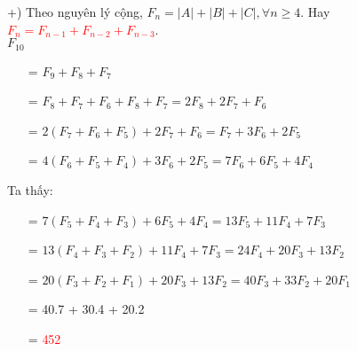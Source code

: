\documentclass[12pt,oneside]{book}
\begin{document}
+) Theo nguyên lý cộng, $F_n = |A|+|B|+|C|, \forall n \geq 4$. Hay \textcolor{red}{$F_n= F_{n-1}+F_{n-2}+F_{n-3}$}.\\
\indent \hspace{0.5cm}$F_{10}$
\begin{itemize}
	\item[=] $F_9+F_8+F_7$
	\item[=] $F_8+F_7+F_6+F_8+F_7 = 2F_8 +2F_7+F_6$
	\item[=] $2(F_7+F_6+F_5)+2F_7+F_6 = F_7 + 3F_6+2F_5$
	\item[=] $4(F_6+F_5+F_4) +3F_6+2F_5 = 7F_6+6F_5+4F_4$
\end{itemize}
Ta thấy: 
\begin{itemize}
	\item[=] $7(F_5+F_4+F_3)+6F_5+4F_4 = 13F_5+11F_4+7F_3$
	\item[=] $13(F_4+F_3+F_2) + 11F_4 +7F_3 = 24F_4+20F_3+13F_2$
	\item[=] $20(F_3+F_2+F_1) + 20F_3+13F_2 = 40F_3+33F_2+20F_1$
	\item[=] 40.7 + 30.4 + 20.2
	\item[=] \textcolor{red}{452}
\end{itemize}
\end{document}
